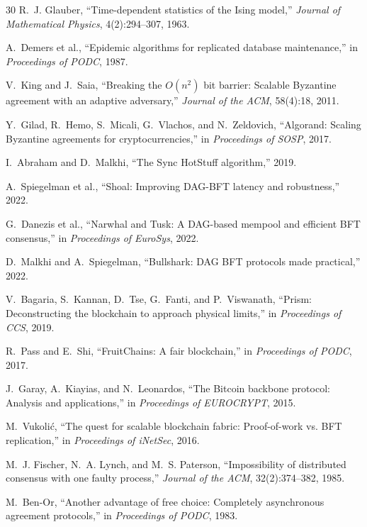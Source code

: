 \documentclass[11pt,a4paper]{article}
\begin{document}
\begin{thebibliography}{30}
R.~J. Glauber, ``Time-dependent statistics of the Ising model,''
\textit{Journal of Mathematical Physics}, 4(2):294--307, 1963.

A.~Demers et al., ``Epidemic algorithms for replicated database maintenance,'' in
\textit{Proceedings of PODC}, 1987.

V.~King and J.~Saia, ``Breaking the $O(n^2)$ bit barrier: Scalable Byzantine agreement
with an adaptive adversary,'' \textit{Journal of the ACM}, 58(4):18, 2011.

Y.~Gilad, R.~Hemo, S.~Micali, G.~Vlachos, and N.~Zeldovich, ``Algorand: Scaling
Byzantine agreements for cryptocurrencies,'' in \textit{Proceedings of SOSP}, 2017.

I.~Abraham and D.~Malkhi, ``The Sync HotStuff algorithm,'' 2019.

A.~Spiegelman et al., ``Shoal: Improving DAG-BFT latency and robustness,'' 2022.

G.~Danezis et al., ``Narwhal and Tusk: A DAG-based mempool and efficient BFT
consensus,'' in \textit{Proceedings of EuroSys}, 2022.

D.~Malkhi and A.~Spiegelman, ``Bullshark: DAG BFT protocols made practical,'' 2022.

V.~Bagaria, S.~Kannan, D.~Tse, G.~Fanti, and P.~Viswanath, ``Prism: Deconstructing
the blockchain to approach physical limits,'' in \textit{Proceedings of CCS}, 2019.

R.~Pass and E.~Shi, ``FruitChains: A fair blockchain,'' in
\textit{Proceedings of PODC}, 2017.

J.~Garay, A.~Kiayias, and N.~Leonardos, ``The Bitcoin backbone protocol: Analysis and
applications,'' in \textit{Proceedings of EUROCRYPT}, 2015.

M.~Vukoli{\'c}, ``The quest for scalable blockchain fabric: Proof-of-work vs. BFT
replication,'' in \textit{Proceedings of iNetSec}, 2016.

M.~J. Fischer, N.~A. Lynch, and M.~S. Paterson, ``Impossibility of distributed
consensus with one faulty process,'' \textit{Journal of the ACM}, 32(2):374--382, 1985.

M.~Ben-Or, ``Another advantage of free choice: Completely asynchronous agreement
protocols,'' in \textit{Proceedings of PODC}, 1983.


\end{thebibliography}
\end{document}
